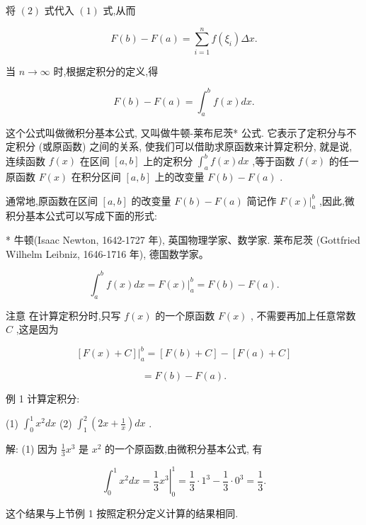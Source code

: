 \documentclass[10pt]{article}
\begin{document}
将 \(\left( 2\right)\) 式代入 \(\left( 1\right)\) 式,从而

\[
F\left( b\right) - F\left( a\right) = \mathop{\sum }\limits_{{i = 1}}^{n}f\left( {\xi }_{i}\right) {\Delta x}.
\]

当 \(n \rightarrow \infty\) 时,根据定积分的定义,得

\[
F\left( b\right) - F\left( a\right) = {\int }_{a}^{b}f\left( x\right) {dx}.
\]

这个公式叫做微积分基本公式, 又叫做牛顿-莱布尼茨* 公式. 它表示了定积分与不定积分 (或原函数) 之间的关系, 使我们可以借助求原函数来计算定积分, 就是说, 连续函数 \(f\left( x\right)\) 在区间 \(\left\lbrack {a,b}\right\rbrack\) 上的定积分 \({\int }_{a}^{b}f\left( x\right) {dx}\) ,等于函数 \(f\left( x\right)\) 的任一原函数 \(F\left( x\right)\) 在积分区间 \(\left\lbrack {a,b}\right\rbrack\) 上的改变量 \(F\left( b\right) - F\left( a\right)\) .

通常地,原函数在区间 \(\left\lbrack {a,b}\right\rbrack\) 的改变量 \(F\left( b\right) - F\left( a\right)\) 简记作 \({\left. F\left( x\right) \right| }_{a}^{b}\) ,因此,微积分基本公式可以写成下面的形式:

* 牛顿(Isaac Newton, 1642-1727 年), 英国物理学家、数学家. 莱布尼茨 (Gottfried Wilhelm Leibniz, 1646-1716 年), 德国数学家。

\[
{\int }_{a}^{b}f\left( x\right) {dx} = {\left. F\left( x\right) \right| }_{a}^{b} = F\left( b\right) - F\left( a\right) .
\]

注意 在计算定积分时,只写 \(f\left( x\right)\) 的一个原函数 \(F\left( x\right)\) , 不需要再加上任意常数 \(C\) ,这是因为

\[
{\left. \left\lbrack F\left( x\right) + C\right\rbrack \right| }_{a}^{b} = \left\lbrack {F\left( b\right) + C}\right\rbrack - \left\lbrack {F\left( a\right) + C}\right\rbrack
\]

\[
= F\left( b\right) - F\left( a\right) \text{.}
\]

例 1 计算定积分:

(1) \({\int }_{0}^{1}{x}^{2}{dx}\) (2) \({\int }_{1}^{2}\left( {{2x} + \frac{1}{x}}\right) {dx}\) .

解: (1) 因为 \(\frac{1}{3}{x}^{3}\) 是 \({x}^{2}\) 的一个原函数,由微积分基本公式, 有

\[
{\int }_{0}^{1}{x}^{2}{dx} = {\left. \frac{1}{3}{x}^{3}\right| }_{0}^{1} = \frac{1}{3} \cdot {1}^{3} - \frac{1}{3} \cdot {0}^{3} = \frac{1}{3}.
\]

这个结果与上节例 1 按照定积分定义计算的结果相同.
\end{document}
